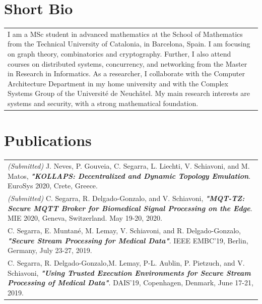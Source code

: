 \documentclass[a4paper,10pt]{article} %
\begin{document}
\section{Short Bio}
\begin{tabular}{p{}}
    I am a MSc student in advanced mathematics at the School of Mathematics from the Technical University of Catalonia, in Barcelona, Spain.
    I am focusing on graph theory, combinatorics and cryptography.
    Further, I also attend courses on distributed systems, concurrency, and networking from the Master in Research in Informatics.
    As a researcher, I collaborate with the Computer Architecture Department in my home university and with the Complex Systems Group of the Universit\'e de Neuch\^atel. 
    My main research interests are systems and security, with a strong mathematical foundation.
\end{tabular}

\section{Publications}
\begin{tabular}{p{}}
    \textit{(Submitted)} J. Neves, P. Gouveia, C. Segarra, L. Liechti, V. Schiavoni, and M. Matos, \textbf{\textit{"KOLLAPS: Decentralized and Dynamic Topology Emulation}}. EuroSys 2020, Crete, Greece. \\[3pt]
    \textit{(Submitted)} C. Segarra, R. Delgado-Gonzalo, and V. Schiavoni, \textbf{\textit{"MQT-TZ: Secure MQTT Broker for Biomedical Signal Processing on the Edge}}. MIE 2020, Geneva, Switzerland. May 19-20, 2020. \\[3pt]
    C. Segarra, E. Muntan\'e, M. Lemay, V. Schiavoni, and  R. Delgado-Gonzalo, \textbf{\textit{"Secure Stream Processing for Medical Data"}}. IEEE EMBC'19, Berlin, Germany, July 23-27, 2019. \\[3pt]
    C. Segarra, R. Delgado-Gonzalo,M. Lemay, P-L. Aublin, P. Pietzuch, and V. Schiavoni, \textbf{\textit{"Using Trusted Execution Environments for Secure Stream Processing of Medical Data"}}. DAIS'19, Copenhagen, Denmark, June 17-21, 2019. \\
\end{tabular}
\end{document}
